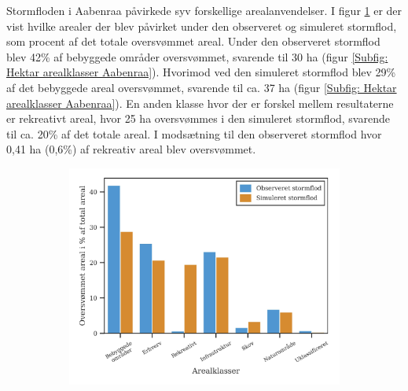 Stormfloden i Aabenraa påvirkede syv forskellige arealanvendelser. I figur \ref{Subfig: Arealklasser i procent Aabenraa} er der vist hvilke arealer der blev påvirket under den observeret og simuleret stormflod, som procent af det totale oversvømmet areal. Under den observeret stormflod blev 42\% af bebyggede områder oversvømmet, svarende til 30 ha (figur \ref{Subfig: Hektar arealklasser Aabenraa}). Hvorimod ved den simuleret stormflod blev 29\% af det bebyggede areal oversvømmet, svarende til ca. 37 ha (figur \ref{Subfig: Hektar arealklasser Aabenraa}). En anden klasse hvor der er forskel mellem resultaterne er rekreativt areal, hvor 25 ha oversvømmes i den simuleret stormflod, svarende til ca. 20\% af det totale areal. I modsætning til den observeret stormflod hvor 0,41 ha (0,6\%) af rekreativ areal blev oversvømmet.
\begin{figure}[H]
    \begin{subfigure}[t]{0.5\textwidth}
        \centering
        \includegraphics[width=1\linewidth]{images/Resultater/areal_anvendelses_grafer/aabenraa_arealanvendelse.jpg}
        \caption{}
        \label{Subfig: Arealklasser i procent Aabenraa}
    \end{subfigure}
    \begin{subfigure}[t]{0.5\textwidth}
        \centering

\end{subfigure}
\end{figure}
